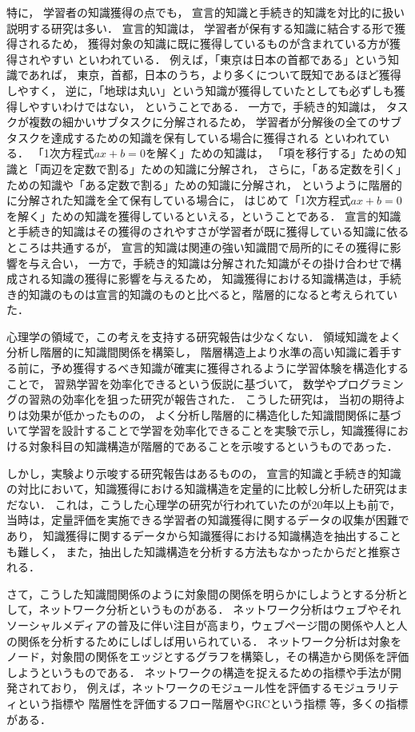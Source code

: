 \documentclass[twocolumn,a4j,10pt]{jsarticle}
\begin{document}
特に，
学習者の知識獲得の点でも，
宣言的知識と手続き的知識を対比的に扱い説明する研究は多い．
宣言的知識は，
学習者が保有する知識に結合する形で獲得されるため，
獲得対象の知識に既に獲得しているものが含まれている方が獲得されやすい
といわれている．
例えば，「東京は日本の首都である」という知識であれば，
東京，首都，日本のうち，より多くについて既知であるほど獲得しやすく，
逆に，「地球は丸い」という知識が獲得していたとしても必ずしも獲得しやすいわけではない，
ということである．
一方で，手続き的知識は，
タスクが複数の細かいサブタスクに分解されるため，
学習者が分解後の全てのサブタスクを達成するための知識を保有している場合に獲得される
といわれている．
「1次方程式$ax + b = 0$を解く」ための知識は，
「項を移行する」ための知識と「両辺を定数で割る」ための知識に分解され，
さらに，「ある定数を引く」ための知識や「ある定数で割る」ための知識に分解され，
というように階層的に分解された知識を全て保有している場合に，
はじめて「1次方程式$ax + b = 0$を解く」ための知識を獲得しているといえる，ということである．
宣言的知識と手続き的知識はその獲得のされやすさが学習者が既に獲得している知識に依るところは共通するが，
宣言的知識は関連の強い知識間で局所的にその獲得に影響を与え合い，
一方で，手続き的知識は分解された知識がその掛け合わせで構成される知識の獲得に影響を与えるため，
知識獲得における知識構造は，手続き的知識のものは宣言的知識のものと比べると，階層的になると考えられていた．


心理学の領域で，この考えを支持する研究報告は少なくない．
領域知識をよく分析し階層的に知識間関係を構築し，
階層構造上より水準の高い知識に着手する前に，予め獲得するべき知識が確実に獲得されるように学習体験を構造化することで，
習熟学習を効率化できるという仮説に基づいて，
数学やプログラミングの習熟の効率化を狙った研究が報告された．
こうした研究は，
当初の期待よりは効果が低かったものの，
よく分析し階層的に構造化した知識間関係に基づいて学習を設計することで学習を効率化できることを実験で示し，知識獲得における対象科目の知識構造が階層的であることを示唆するというものであった．


しかし，実験より示唆する研究報告はあるものの，
宣言的知識と手続き的知識の対比において，知識獲得における知識構造を定量的に比較し分析した研究はまだない．
これは，こうした心理学の研究が行われていたのが20年以上も前で，
当時は，定量評価を実施できる学習者の知識獲得に関するデータの収集が困難であり，
知識獲得に関するデータから知識獲得における知識構造を抽出することも難しく，
また，抽出した知識構造を分析する方法もなかったからだと推察される．



さて，こうした知識間関係のように対象間の関係を明らかにしようとする分析として，ネットワーク分析というものがある．
ネットワーク分析はウェブやそれソーシャルメディアの普及に伴い注目が高まり，ウェブページ間の関係や人と人の関係を分析するためにしばしば用いられている．
ネットワーク分析は対象をノード，対象間の関係をエッジとするグラフを構築し，その構造から関係を評価しようというものである．
ネットワークの構造を捉えるための指標や手法が開発されており，
例えば，ネットワークのモジュール性を評価するモジュラリティ\cite{newman2006modularity}という指標や
階層性を評価するフロー階層\cite{luo2011detecting}やGRC\cite{mones2012hierarchy}という指標
等，多くの指標がある．
\end{document}
